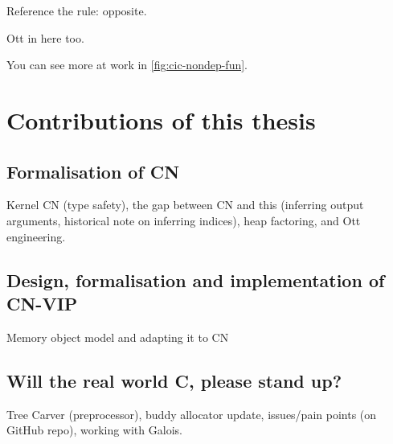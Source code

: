 Reference the rule:  opposite.

\begin{marginfigure}
\ContinuedFloat{}
  \caption{Ott in here too.}\label{fig:cic-nondep-fun}
\end{marginfigure}

You can see more at work in \cref{fig:cic-nondep-fun}.

\section{Contributions of this thesis}\label{sec:contributions}

\subsection{Formalisation of CN}

Kernel CN (type safety), the gap between CN and this (inferring output
arguments, historical note on inferring indices), heap factoring, and Ott
engineering.

\subsection{Design, formalisation and implementation of CN-VIP}

Memory object model and adapting it to CN

\subsection{Will the real world C, please stand up?}

Tree Carver (preprocessor), buddy allocator update, issues/pain points (on
GitHub repo), working with Galois.

